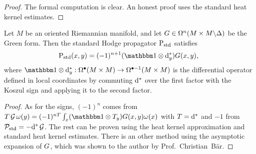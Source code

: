 \documentclass[\MainFolder/Text.tex]{subfiles}
\begin{document}
\begin{proof}
The formal computation is clear. An honest proof uses the standard heat kernel estimates.
\end{proof}

\begin{Proposition}\label{Prop:StdCodifInt}
Let $M$ be an oriented Riemannian manifold, and let $G\in \Omega^n(M\times M\backslash\Delta)$ be the Green form. Then the standard Hodge propagator $\mathrm{P}_{\mathrm{std}}$ satisfies
$$ \StdPrpg(x,y)= (-1)^{n+1}(\Id\otimes \CoDd_y)\GKer(x,y), $$
where $\Id\otimes \CoDd_y: \DR^\bullet(M\times M) \rightarrow \DR^{\bullet-1}(M \times M)$ is the differential operator defined in local coordinates by commuting $\mathrm{d}^*$ over the first factor with the Koszul sign and applying it to the second factor.
\end{Proposition}
\begin{proof}
As for the signs, $(-1)^n$ comes from $\TOp \GOp \omega(y) = (-1)^{nT}\int_x(\Id \otimes \TOp_y)\GKer(x,y)\omega(x)$ with $T=\mathrm{d}^*$ and $-1$ from $\mathcal{P}_{\mathrm{std}} = - \mathrm{d}^*\operatorname{\mathcal{G}}$. The rest can be proven using the heat kernel approximation and standard heat kernel estimates. There is an other method using the asymptotic expansion of $G$, which was shown to the author by Prof.~Christian~Bär.
\end{proof}
%
%

%
%

%
\end{document}
